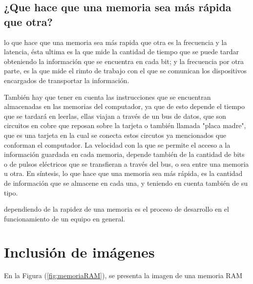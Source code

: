\documentclass{article}
\begin{document}
\subsection{¿Que hace que una memoria sea más rápida que otra?}
%
lo que hace que una memoria sea más rapida que otra es la frecuencia y la latencia, ésta ultima es la que mide la cantidad de tiempo que se puede tardar obteniendo la información que se encuentra en cada bit; y la frecuencia por otra parte, es la que mide el rimto de trabajo con el que se comunican los dispositivos encargados de transportar la información.

También hay que tener en cuenta las instrucciones que se encuentran almacenadas en las memorias del computador, ya que de esto depende el tiempo que se tardará en leerlas, ellas viajan a través de un bus de datos, que son circuitos en cobre que reposan sobre la tarjeta o también llamada "placa madre", que es una tarjeta en la cual se conecta estos circutos ya mencionados que conforman el computador.
La velocidad con la que se permite el acceso a la información guardada en cada memoria, depende también de la cantidad de bits o de pulsos eléctricos que se transfieran a través del bus, o sea entre una memoria u otra.
En síntesis, lo que hace que una memoria sea más rápida, es la cantidad de información que se almacene en cada una, y teniendo en cuenta también de su tipo. 

dependiendo de la rapidez de una memoria es el proceso de desarrollo en el funcionamiento de un equipo en general.


\section{Inclusión de imágenes} \label{imagenes}

En la Figura (\ref{fig:memoriaRAM}), se presenta la imagen de una memoria RAM



\end{document}
